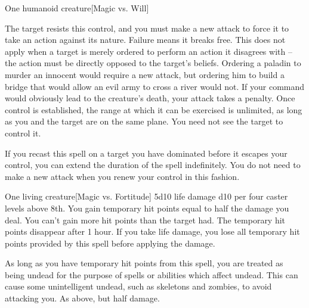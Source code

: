 \begin{spelleffects}
\begin{spelltarget}{One humanoid creature}[Magic vs. Will]
        \par The target resists this control, and you must make a new attack to force it to take an action against its nature. Failure means it breaks free. This does not apply when a target is merely ordered to perform an action it disagrees with -- the action must be directly opposed to the target's beliefs. Ordering a paladin to murder an innocent would require a new attack, but ordering him to build a bridge that would allow an evil army to cross a river would not. If your command would obviously lead to the creature's death, your attack takes a  penalty. Once control is established, the range at which it can be exercised is unlimited, as long as you and the target are on the same plane. You need not see the target to control it.
        \par If you recast this spell on a target you have dominated before it escapes your control, you can extend the duration of the spell indefinitely. You do not need to make a new attack when you renew your control in this fashion.
    \end{spelltarget}
\end{spelleffects}
\begin{spellfooter}
    
\end{spellfooter}

\begin{spellheader}
    \spellrng{\rngclose}
    \spelldur{\durlong}
\end{spellheader}
\begin{spelleffects}
    \begin{spelltarget}{One living creature}[Magic vs. Fortitude]
        \spellsuccess 5d10 life damage \add d10 per four caster levels above 8th. You gain temporary hit points equal to half the damage you deal. You can't gain more hit points than the target had. The temporary hit points disappear after 1 hour. If you take life damage, you lose all temporary hit points provided by this spell before applying the damage.

        As long as you have temporary hit points from this spell, you are treated as being undead for the purpose of spells or abilities which affect undead. This can cause some unintelligent undead, such as skeletons and zombies, to avoid attacking you.
        \spellfailure As above, but half damage.
    \end{spelltarget}
\end{spelleffects}
\begin{spellfooter}
    
\end{spellfooter}

